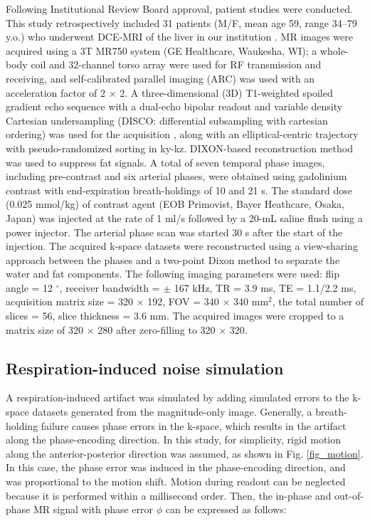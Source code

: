 \documentclass[num-refs]{wiley-article}
\begin{document}
Following Institutional Review Board approval, patient studies were conducted. This study retrospectively included 31 patients (M/F, mean age 59, range 34–79 y.o.) who underwent DCE-MRI of the liver in our institution . MR images were acquired using a 3T MR750 system (GE Healthcare, Waukesha, WI); a whole-body coil and 32-channel torso array were used for RF transmission and receiving, and self-calibrated parallel imaging (ARC) was used with an acceleration factor of 2 $\times$ 2. A three-dimensional (3D) T1-weighted spoiled gradient echo sequence with a dual-echo bipolar readout and variable density Cartesian undersampling (DISCO: differential subsampling with cartesian ordering) was used for the acquisition \cite{saranathan2012differential}, along with an elliptical-centric trajectory with pseudo-randomized sorting in ky-kz. DIXON-based reconstruction method was used to suppress fat signals\cite{reeder2004multicoil}. A total of seven temporal phase images, including pre-contrast and six arterial phases, were obtained using gadolinium contrast with end-expiration breath-holdings of 10 and 21 s. The standard dose (0.025 mmol/kg) of contrast agent (EOB Primovist, Bayer Heathcare, Osaka, Japan) was injected at the rate of 1 ml/s followed by a 20-mL saline flush using a power injector. The arterial phase scan was started 30 s after the start of the injection. The acquired k-space datasets were reconstructed using a view-sharing approach between the phases and a two-point Dixon method to separate the water and fat components. The following imaging parameters were used: flip angle = 12 $^\circ$, receiver bandwidth = $\pm$ 167 kHz, TR = 3.9 ms, TE = 1.1/2.2 ms, acquisition matrix size = 320 $\times$ 192, FOV = 340 $\times$ 340 mm$^2$, the total number of slices = 56, slice thickness = 3.6 mm. The acquired images were cropped to a matrix size of 320 $\times$ 280 after zero-filling to 320 $\times$ 320.

\subsection{Respiration-induced noise simulation}\label{sec_resp_sim}

A respiration-induced artifact was simulated by adding simulated errors to the k-space datasets generated from the magnitude-only image. Generally, a breath-holding failure causes phase errors in the k-space, which results in the artifact along the phase-encoding direction. In this study, for simplicity, rigid motion along the anterior-posterior direction was assumed, as shown in Fig. \ref{fig_motion}. In this case, the phase error was induced in the phase-encoding direction, and was proportional to the motion shift. Motion during readout can be neglected because it is performed within a millisecond order.  Then, the in-phase and out-of-phase MR signal with phase error $\phi$ can be expressed as follows:
\end{document}
